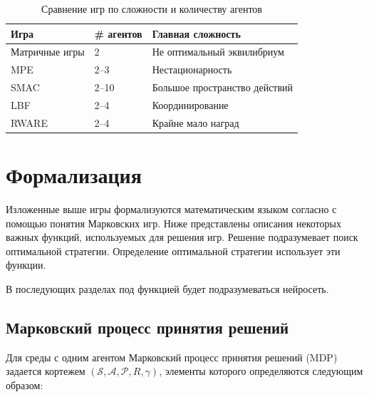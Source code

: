 \begin{table}[H]
	\centering
	\caption{Сравнение игр по сложности и количеству агентов}
	\label{tab:games2}
	\begin{tabular}{@{}|l|l|l|@{}}
		\toprule
		Игра           & \# агентов & Главная сложность             \\ \midrule
		Матричные игры & 2          & Не оптимальный эквилибриум    \\
		MPE            & 2--3       & Нестационарность              \\
		SMAC           & 2--10      & Большое пространство действий \\
		LBF            & 2--4       & Координирование               \\
		RWARE          & 2--4       & Крайне мало наград            \\ \bottomrule
	\end{tabular}
\end{table}

\section{Формализация}

Изложенные выше игры формализуются математическим языком согласно \cite{DBLP:journals/corr/abs-2011-00583} с помощью понятия Марковских игр.
Ниже представлены описания некоторых важных функций, используемых для решения игр.
Решение подразумевает поиск оптимальной стратегии. Определение оптимальной стратегии использует эти функции.

В последующих разделах под функцией будет подразумеваться нейросеть.

\subsection{Марковский процесс принятия решений} \label{sec:mdp}

Для среды с одним агентом Марковский процесс принятия решений (MDP) задается кортежем \( (\mathcal{S}, \mathcal{A}, \mathcal{P}, R, \gamma )\), элементы которого определяются следующим образом:

